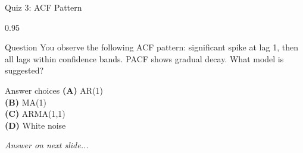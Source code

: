 \documentclass[9pt, aspectratio=169, t]{beamer}
\begin{document}
\begin{frame}{Quiz 3: ACF Pattern}
    \begin{cminipage}{0.95\textwidth}
    \begin{alertblock}{Question}
        You observe the following ACF pattern: significant spike at lag 1, then all lags within confidence bands. PACF shows gradual decay. What model is suggested?
    \end{alertblock}

    \vspace{0.4cm}

    \begin{block}{Answer choices}
        \textcolor{MainBlue}{\textbf{(A)}} AR(1)\\[3pt]
        \textcolor{MainBlue}{\textbf{(B)}} MA(1)\\[3pt]
        \textcolor{MainBlue}{\textbf{(C)}} ARMA(1,1)\\[3pt]
        \textcolor{MainBlue}{\textbf{(D)}} White noise
    \end{block}

    \vspace{0.5cm}

    \begin{center}
        \textit{Answer on next slide...}
    \end{center}
    \end{cminipage}
\end{frame}
\end{document}
